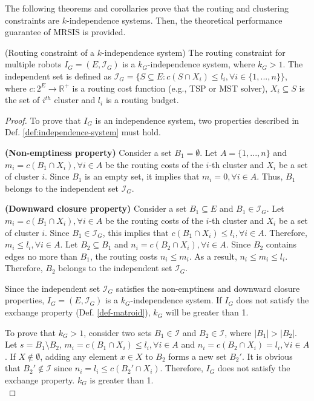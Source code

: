 The following theorems and corollaries prove that the routing and clustering constraints are $k$-independence systems.
Then, the theoretical performance guarantee of MRSIS \cite{li2024mrsis} is provided.


\begin{theorem} \label{thm:general-routing} (Routing constraint of a $k$-independence system)
The routing constraint for multiple robots $I_G=(E, \mathcal{I}_G)$ is a $k_G$-independence system, where $k_G > 1$. The independent set is defined as $\mathcal{I}_G=\{S \subseteq E : c(S \cap X_i) \leq l_i , \forall i\in \{1,...,n\}\}$, where $c:2^E \rightarrow \mathbb{R}^+$ is a routing cost function (e.g., TSP or MST solver), $X_i \subseteq S$ is the set of $i^{th}$ cluster and $l_i$ is a routing budget.
\end{theorem}
\begin{proof}
To prove that $I_G$ is an independence system, two properties described in Def. \ref{def:independence-system} must hold.

\textbf{(Non-emptiness property)} Consider a set $B_1=\emptyset$.
Let $A=\{1,...,n\}$ and $m_i=c(B_1 \cap X_i), \forall i\in A$ be the routing costs of the $i$-th cluster and $X_i$ be a set of cluster $i$. Since $B_1$ is an empty set, it implies that $m_i=0, \forall i\in A$. Thus, $B_1$ belongs to the independent set $\mathcal{I}_G$.

\textbf{(Downward closure property)} Consider a set $B_1\subseteq E$ and $B_1 \in \mathcal{I}_G$. Let $m_i=c(B_1 \cap X_i), \forall i\in A$ be the routing costs of the $i$-th cluster and $X_i$ be a set of cluster $i$.
Since $B_1 \in \mathcal{I}_G$, this implies that $c(B_1 \cap X_i) \leq l_i, \forall i\in A$. Therefore, $m_i \leq l_i, \forall i\in A$. Let $B_2 \subseteq B_1$ and $n_i=c(B_2 \cap X_i), \forall i\in A$. Since $B_2$ contains edges no more than $B_1$, the routing costs $n_i \leq m_i$. As a result, $n_i \leq m_i \leq l_i$. Therefore, $B_2$ belongs to the independent set $\mathcal{I}_G$.

Since the independent set $\mathcal{I}_G$ satisfies the non-emptiness and downward closure properties, $I_G=(E, \mathcal{I}_G)$ is a $k_G$-independence system. If $I_G$ does not satisfy the exchange property (Def. \ref{def-matroid}), $k_G$ will be greater than 1.

To prove that $k_G > 1$, consider two sets $B_1\in \mathcal{I}$ and $B_2 \in \mathcal{I}$, where $|B_1|>|B_2|$.
Let $s=B_1 \setminus B_2$, $m_i=c(B_1 \cap X_i)\leq l_i, \forall i\in A$ and $n_i=c(B_2 \cap X_i)=l_i, \forall i\in A$. If $X \notin \emptyset$, adding any element $x \in X$ to $B_2$ forms a new set $B_2'$. It is obvious that $B_2' \notin \mathcal{I}$ since $n_i=l_i \leq c(B_2' \cap X_i)$.
Therefore, $I_G$ does not satisfy the exchange property. $k_G$ is greater than 1.
\\
\end{proof}

